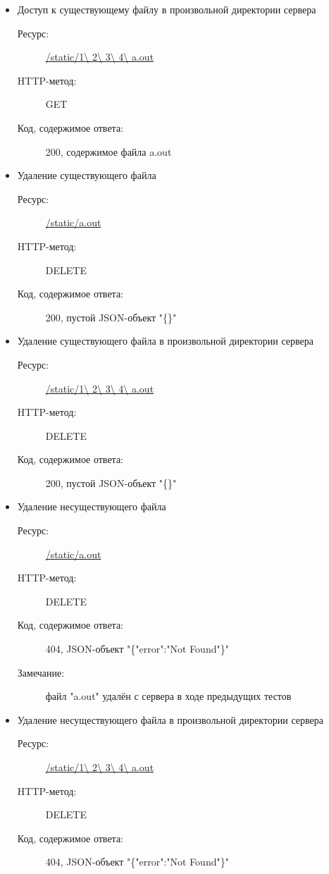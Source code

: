 \documentclass[a4paper,12pt]{report}
\numberwithin{equation}{section}
\begin{document}
\begin{itemize}
  \item Доступ к существующему файлу в произвольной директории сервера
  \begin{description}
    \item[Ресурс:] \url{/static/1\ 2\ 3\ 4\ a.out}
    \item[HTTP-метод:] GET
    \item[Код, содержимое ответа:] 200, содержимое файла a.out
  \end{description}
  
  \item Удаление существующего файла
  \begin{description}
    \item[Ресурс:] \url{/static/a.out}
    \item[HTTP-метод:] DELETE
    \item[Код, содержимое ответа:] 200, пустой JSON-объект "\{\}"
  \end{description}
  
  \item Удаление существующего файла в произвольной директории сервера
  \begin{description}
    \item[Ресурс:] \url{/static/1\ 2\ 3\ 4\ a.out}
    \item[HTTP-метод:] DELETE
    \item[Код, содержимое ответа:] 200, пустой JSON-объект "\{\}"
  \end{description}
  
  \item Удаление несуществующего файла
  \begin{description}
    \item[Ресурс:] \url{/static/a.out}
    \item[HTTP-метод:] DELETE
    \item[Код, содержимое ответа:] 404, JSON-объект "\{"error":"Not Found"\}"
    \item[Замечание:] файл "a.out" удалён с сервера в ходе предыдущих тестов
  \end{description}
  
  \item Удаление несуществующего файла в произвольной директории сервера
  \begin{description}
    \item[Ресурс:] \url{/static/1\ 2\ 3\ 4\ a.out}
    \item[HTTP-метод:] DELETE
    \item[Код, содержимое ответа:] 404, JSON-объект "\{"error":"Not Found"\}"
  \end{description}
  

\end{itemize}
\end{document}
